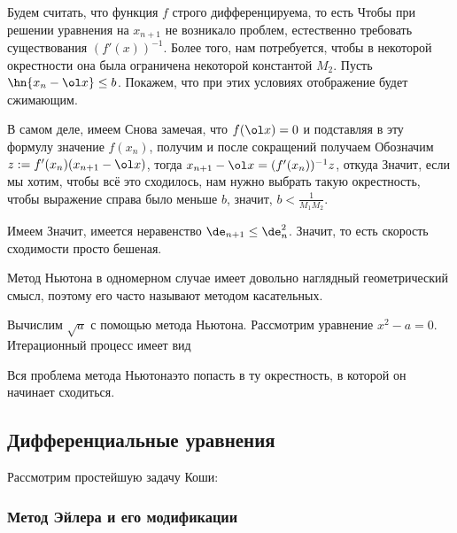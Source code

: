 \documentclass[a4paper]{article}
\begin{document}
Будем считать, что функция $f$ строго дифференцируема, то есть
Чтобы при решении уравнения на $x_{n+1}$ не возникало проблем, естественно требовать
существования $(f'(x))^{-1}$. Более того, нам потребуется, чтобы в некоторой окрестности
она была ограничена некоторой константой $M_2$. Пусть $\hn{x_n - \ol x} \le b$.
Покажем, что при этих условиях отображение будет сжимающим.

В самом деле, имеем
Снова замечая, что $f(\ol x) = 0$ и подставляя в эту формулу значение $f(x_n)$, получим
и после сокращений получаем
Обозначим $z := f'(x_n) (x_{n+1} - \ol x)$, тогда $x_{n+1} - \ol x = (f'(x_n))^{-1}z$,
откуда
Значит, если мы хотим, чтобы всё это сходилось, нам нужно выбрать такую окрестность,
чтобы выражение справа было меньше $b$, значит, $b < \frac{1}{M_1 M_2}$.

Имеем
Значит, имеется неравенство $\de_{n+1} \le \de_n^2$. Значит,
то есть скорость сходимости просто бешеная.

\begin{note}
Метод Ньютона в одномерном случае имеет довольно наглядный геометрический смысл,
поэтому его часто называют методом касательных.
\end{note}

\begin{ex}
Вычислим $\sqrt{a}$ с помощью метода Ньютона.
Рассмотрим уравнение $x^2 - a = 0$. Итерационный процесс имеет вид
\end{ex}

Вся проблема метода Ньютона\т это попасть в ту окрестность, в которой он начинает сходиться.

\subsection{Дифференциальные уравнения}

Рассмотрим простейшую задачу Коши:

\subsubsection{Метод Эйлера и его модификации}
\end{document}

